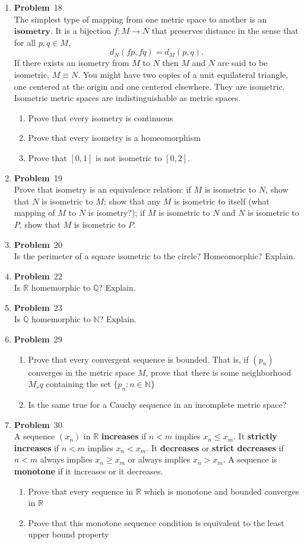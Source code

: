 \documentclass[12pt]{amsart}
\newcommand{\benu}{\begin{enumerate}}
\newcommand{\eenu}{\end{enumerate}}
\theoremstyle{definition}
\newcommand{\mbR}{\mathbb{R}}
\newcommand{\mbN}{\mathbb{N}}
\newcommand{\mbQ}{\mathbb{Q}}
\newcommand{\itep}{\item {\bfseries Problem}\ }
\begin{document}
\begin{enumerate}[series=p]
\newpage

\itep 18\\
The simplest type of mapping from one metric space to another is an $\textbf{isometry}$.  It is a bijection $f:M \rightarrow N$ that preserves distance in the sense that for all $p,q \in M$,
$$d_N(fp, fq) = d_M(p,q).$$
If there exists an isometry from $M$ to $N$ then $M$ and $N$ are said to be isometric, $M \equiv N$.  You might have two copies of a unit equilateral triangle, one centered at the origin and one centered elsewhere.  They are isometric.  Isometric metric spaces are indistinguishable as metric spaces.
\benu
\item Prove that every isometry is continuous
\item Prove that every isometry is a homeomorphism
\item Prove that $[0,1]$ is not isometric to $[0,2]$.
\eenu

\newpage

\itep 19\\
Prove that isometry is an equivalence relation: if $M$ is isometric to $N$, show that $N$ is isometric to $M$; show that any $M$ is isometric to itself (what mapping of $M$ to $N$ is isometry?); if $M$ is isometric to $N$ and $N$ is isometric to $P$, show that $M$ is isometric to $P$.

\newpage

\itep 20\\
Is the perimeter of a square isometric to the circle?  Homeomorphic?  Explain.

\newpage

\itep 22\\
Is $\mbR$ homemorphic to $\mbQ$?  Explain.

\newpage

\itep 23\\
Is $\mbQ$ homemorphic to $\mbN$?  Explain.

\newpage

\itep 29\\
\benu
\item Prove that every convergent sequence is bounded.  That is, if $(p_n)$ converges in the metric space $M$, prove that there is some neighborhood $M_rq$ containing the set $\{p_n:n\in \mbN\}$
\item Is the same true for a Cauchy sequence in an incomplete metric space?
\eenu
\newpage


\itep 30\\
A sequence $(x_n)$ in $\mbR$ \textbf{increases} if $n< m$ implies $x_n \leq x_m$.  It \textbf{strictly increases} if $n < m$ implies $x_n < x_m$.  It \textbf{decreases} or \textbf{strict decreases} if $n < m$ always implies $x_n \geq x_m$ or always implies $x_n > x_m$.  A sequence is \textbf{monotone} if it increases or it decreases.
\benu
\item Prove that every sequence in $\mbR$ which is monotone and bounded converges in $\mbR$
\item Prove that this monotone sequence condition is equivalent to the least upper bound property
\eenu


\end{enumerate}
\end{document}
